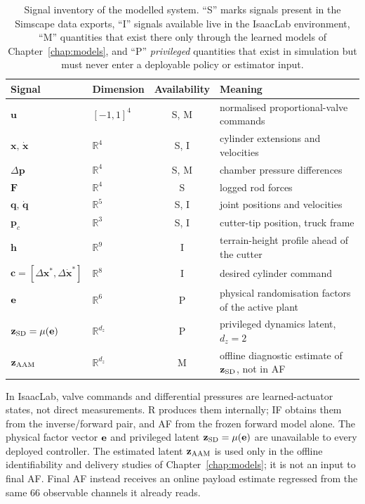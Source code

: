 \begin{table}[htbp]
  \centering
  \caption{Signal inventory of the modelled system. ``S'' marks signals
  present in the Simscape data exports, ``I'' signals available live in
  the IsaacLab environment, ``M'' quantities that exist there only
  through the learned models of Chapter~\ref{chap:models}, and ``P''
  \emph{privileged} quantities that exist in simulation but must never
  enter a deployable policy or estimator input.}
  \label{tab:sys:signals}
  \small
  \begin{tabular}{@{}llcl@{}}
    \toprule
    Signal & Dimension & Availability & Meaning \\
    \midrule
    $\bm{u}$ & $[-1,1]^4$ & S, M & normalised proportional-valve commands \\
    $\bm{x},\, \dot{\bm{x}}$ & $\mathbb{R}^4$ & S, I & cylinder extensions and velocities \\
    $\Delta\bm{p}$ & $\mathbb{R}^4$ & S, M & chamber pressure differences \\
    $\bm{F}$ & $\mathbb{R}^4$ & S & logged rod forces \\
    $\bm{q},\, \dot{\bm{q}}$ & $\mathbb{R}^5$ & S, I & joint positions and velocities \\
    $\bm{p}_c$ & $\mathbb{R}^3$ & S, I & cutter-tip position, truck frame \\
    $\bm{h}$ & $\mathbb{R}^{9}$ & I & terrain-height profile ahead of the cutter \\
    $\bm{c} = [\Delta\bm{x}^*, \Delta\dot{\bm{x}}^*]$ & $\mathbb{R}^8$ & I & desired cylinder command \\
    $\mathbf{e}$ & $\mathbb{R}^6$ & P & physical randomisation factors of the active plant \\
    $\mathbf{z}_{\mathrm{SD}} = \mu(\mathbf{e})$ & $\mathbb{R}^{d_z}$ & P & privileged dynamics latent, $d_z = 2$ \\
    $\mathbf{z}_{\mathrm{AAM}}$ & $\mathbb{R}^{d_z}$ & M & offline diagnostic estimate of $\mathbf{z}_{\mathrm{SD}}$, not in AF \\
    \bottomrule
  \end{tabular}
\end{table}

In IsaacLab, valve commands and differential pressures are learned-actuator
states, not direct measurements. R produces them internally; IF obtains them
from the inverse/forward pair, and AF from the frozen forward model alone. The
physical factor vector $\mathbf{e}$ and privileged latent
$\mathbf{z}_{\mathrm{SD}}=\mu(\mathbf{e})$ are unavailable to every deployed controller. The
estimated latent $\mathbf{z}_{\mathrm{AAM}}$ is used only in the offline identifiability and
delivery studies of Chapter~\ref{chap:models}; it is not an input to final AF.
Final AF instead receives an online payload estimate regressed from the same
$66$ observable channels it already reads.

